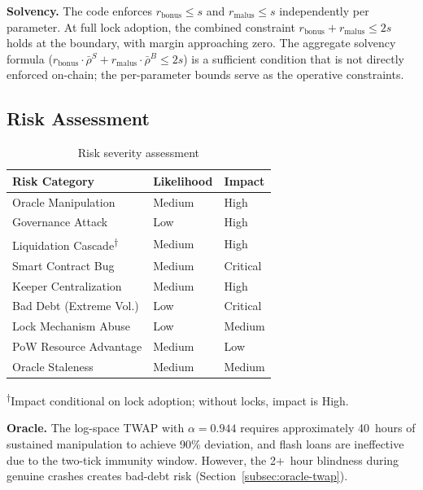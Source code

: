 \documentclass[10pt,a4paper,twocolumn]{article}
\theoremstyle{definition}
\theoremstyle{plain}
\theoremstyle{remark}
\begin{document}
\textbf{Solvency.} The code enforces $r_{\text{bonus}} \leq s$ and $r_{\text{malus}} \leq s$ independently per parameter. At full lock adoption, the combined constraint $r_{\text{bonus}} + r_{\text{malus}} \leq 2s$ holds at the boundary, with margin approaching zero. The aggregate solvency formula ($r_{\text{bonus}} \cdot \bar{\rho}^S + r_{\text{malus}} \cdot \bar{\rho}^B \leq 2s$) is a sufficient condition that is not directly enforced on-chain; the per-parameter bounds serve as the operative constraints.

\subsection{Risk Assessment}

\begin{table}[htbp]
\centering
\caption{Risk severity assessment}
\label{tab:risks}
\small
\begin{tabularx}{0.95\columnwidth}{@{}l >{\centering\arraybackslash}X >{\centering\arraybackslash}X@{}}
\toprule
Risk Category & Likelihood & Impact \\
\midrule
Oracle Manipulation & Medium & High \\
Governance Attack & Low & High \\
Liquidation Cascade\textsuperscript{$\dagger$} & Medium & High \\
Smart Contract Bug & Medium & Critical \\
Keeper Centralization & Medium & High \\
Bad Debt (Extreme Vol.) & Low & Critical \\
Lock Mechanism Abuse & Low & Medium \\
PoW Resource Advantage & Medium & Low \\
Oracle Staleness & Medium & Medium \\
\bottomrule
\end{tabularx}
\vspace{0.5em}
\par\raggedright\scriptsize\textsuperscript{$\dagger$}Impact conditional on lock adoption; without locks, impact is High.
\end{table}

\textbf{Oracle.} The log-space TWAP with $\alpha = 0.944$ requires approximately 40~hours of sustained manipulation to achieve 90\% deviation, and flash loans are ineffective due to the two-tick immunity window. However, the 2+~hour blindness during genuine crashes creates bad-debt risk (Section~\ref{subsec:oracle-twap}).
\end{document}
